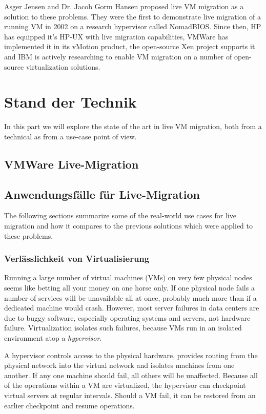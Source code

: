 \documentclass[journal]{IEEEtran}
\begin{document}
Asger Jensen and Dr. Jacob Gorm Hansen proposed live VM migration as a
solution to these problems. They were the first to demonstrate live
migration of a running VM in 2002 on a research hypervisor called
NomadBIOS. Since then, HP has equipped it's HP-UX with live migration
capabilities, VMWare has implemented it in its vMotion product, the
open-source Xen project supports it and IBM is actively researching to
enable VM migration on a number of open-source virtualization
solutions.

\section{Stand der Technik}
\label{sec:sota}

In this part we will explore the state of the art in live VM
migration, both from a technical as from a use-case point of view.

\subsection{VMWare Live-Migration}
\label{sec:livemigration}
\blindtext

\subsection{Anwendungsfälle für Live-Migration}

The following sections summarize some of the real-world use cases for
live migration and how it compares to the previous solutions which
were applied to these problems.

\subsubsection{Verlässlichkeit von Virtualisierung}

Running a large number of virtual machines (VMs) on very few physical
nodes seems like betting all your money on one horse only. If one
physical node fails a number of services will be unavailable all at
once, probably much more than if a dedicated machine would
crash. However, most server failures in data centers are due to buggy
software, especially operating systems and servers, not hardware
failure. Virtualization isolates such failures, because VMs run in an
isolated environment atop a \emph{hypervisor}.

A hypervisor controls access to the physical hardware, provides
routing from the physical network into the virtual network and
isolates machines from one another. If any one machine should fail,
all others will be unaffected. Because all of the operations within a
VM are virtualized, the hypervisor can checkpoint virtual servers at
regular intervals. Should a VM fail, it can be restored from an
earlier checkpoint and resume operations.
\end{document}
